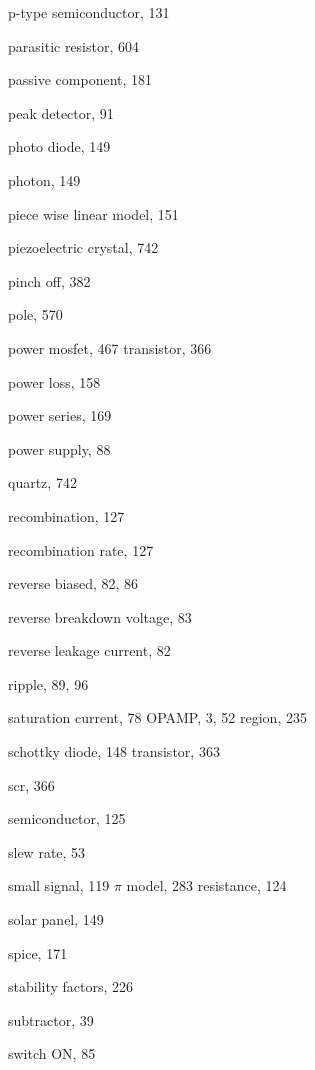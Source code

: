 \begin{theindex}
\begin{otherlanguage}{english}
  \item p-type semiconductor, 131
  \item parasitic resistor, 604
  \item passive component, 181
  \item peak detector, 91
  \item photo diode, 149
  \item photon, 149
  \item piece wise linear model, 151
  \item piezoelectric crystal, 742
  \item pinch off, 382
  \item pole, 570
  \item power
    \subitem mosfet, 467
    \subitem transistor, 366
  \item power loss, 158
  \item power series, 169
  \item power supply, 88

  \indexspace

  \item quartz, 742

  \indexspace

  \item recombination, 127
  \item recombination rate, 127
  \item reverse biased, 82, 86
  \item reverse breakdown voltage, 83
  \item reverse leakage current, 82
  \item ripple, 89, 96

  \indexspace

  \item saturation
    \subitem current, 78
    \subitem OPAMP, 3, 52
    \subitem region, 235
  \item schottky
    \subitem diode, 148
    \subitem transistor, 363
  \item scr, 366
  \item semiconductor, 125
  \item slew rate, 53
  \item small signal, 119
    \subitem $\pi $ model, 283
    \subitem resistance, 124
  \item solar panel, 149
  \item spice, 171
  \item stability factors, 226
  \item subtractor, 39
  \item switch ON, 85


\end{otherlanguage}
\end{theindex}
